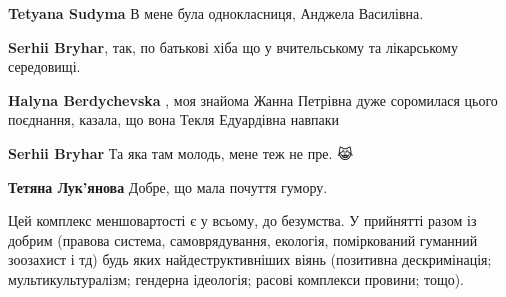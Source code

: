 \begin{itemize}
\begin{itemize}
 
\textbf{Tetyana Sudyma}
В мене була однокласниця,
Анджела Василівна.

 
\textbf{Serhii Bryhar}, так, по батькові хіба що у вчительському та лікарському середовищі.

 
\textbf{Halyna Berdychevska} , моя знайома Жанна Петрівна дуже соромилася цього поєднання, казала, що вона Текля Едуардівна навпаки \Laughey[1.0][white]

 
\textbf{Serhii Bryhar} Та яка там молодь, мене теж не пре. 😹

 
\textbf{Тетяна Лук'янова}
Добре, що мала почуття гумору.

 

Цей комплекс меншовартості є у всьому, до безумства. У прийнятті разом із
добрим (правова система, самоврядування, екологія, поміркований гуманний
зоозахист і тд) будь яких найдеструктивніших віянь (позитивна дескримінація;
мультикультуралізм; гендерна ідеологія; расові комплекси провини; тощо).


\end{itemize}
\end{itemize}
